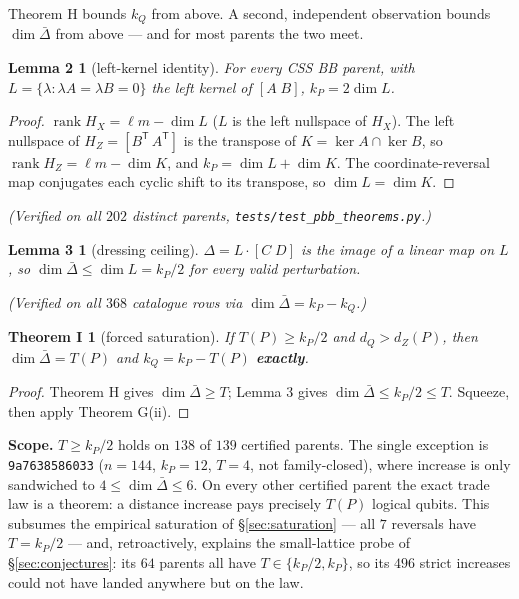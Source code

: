 \documentclass[11pt]{article}
\theoremstyle{plain}
\newtheorem*{lemma2}{Lemma 2}
\newtheorem*{lemma3}{Lemma 3}
\newtheorem*{theoremI}{Theorem I}
\theoremstyle{remark}
\begin{document}
Theorem H bounds $k_Q$ from above. A second, independent observation bounds
$\dim\bar\Delta$ from above --- and for most parents the two meet.

\begin{lemma2}[left-kernel identity]
For every CSS BB parent, with
$L=\{\lambda:\lambda A=\lambda B=0\}$ the left kernel of $[A\;B]$,
$k_P = 2\dim L$.
\end{lemma2}

\begin{proof}
$\operatorname{rank}H_X=\ell m-\dim L$ ($L$ is the left nullspace of
$H_X$). The left nullspace of $H_Z=[B^{\mathsf T}\,A^{\mathsf T}]$ is the
transpose of $K=\ker A\cap\ker B$, so $\operatorname{rank}H_Z=\ell m-\dim K$,
and $k_P=\dim L+\dim K$. The coordinate-reversal map conjugates each cyclic
shift to its transpose, so $\dim L=\dim K$.
\end{proof}

\emph{(Verified on all $202$ distinct parents, \texttt{tests/test\_pbb\_theorems.py}.)}

\begin{lemma3}[dressing ceiling]
$\Delta=L\cdot[C\;D]$ is the image of a
linear map on $L$, so $\dim\bar\Delta\le\dim L=k_P/2$ for every valid
perturbation.
\end{lemma3}
\emph{(Verified on all $368$ catalogue rows via $\dim\bar\Delta=k_P-k_Q$.)}

\begin{theoremI}[forced saturation]
If $T(P)\ge k_P/2$ and $d_Q>d_Z(P)$, then
$\dim\bar\Delta=T(P)$ and $k_Q=k_P-T(P)$ \textbf{exactly}.
\end{theoremI}

\begin{proof}
Theorem H gives $\dim\bar\Delta\ge T$; Lemma 3 gives
$\dim\bar\Delta\le k_P/2\le T$. Squeeze, then apply Theorem G(ii).
\end{proof}

\textbf{Scope.} $T\ge k_P/2$ holds on $138$ of $139$ certified parents. The single
exception is \texttt{9a7638586033} ($n=144$, $k_P=12$, $T=4$, not family-closed),
where increase is only sandwiched to $4\le\dim\bar\Delta\le 6$. On every other
certified parent the exact trade law is a theorem: a distance increase pays
precisely $T(P)$ logical qubits. This subsumes the empirical saturation of \S\ref{sec:saturation}
--- all $7$ reversals have $T=k_P/2$ --- and, retroactively, explains the
small-lattice probe of \S\ref{sec:conjectures}: its $64$ parents all have $T\in\{k_P/2,k_P\}$, so
its $496$ strict increases could not have landed anywhere but on the law.
\end{document}
